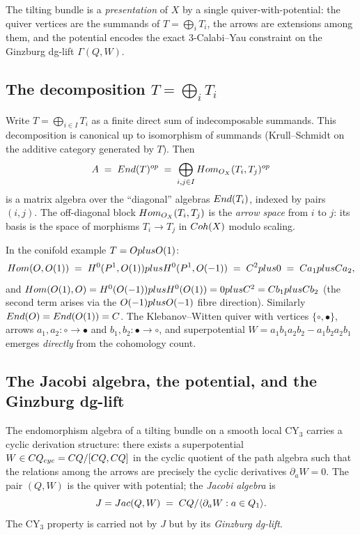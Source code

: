 The tilting bundle is a \emph{presentation} of $X$ by a single
quiver-with-potential: the quiver vertices are the summands of
$T = \bigoplus_i T_i$, the arrows are extensions among them, and the potential
encodes the exact $3$-Calabi--Yau constraint on the Ginzburg dg-lift
$\Gamma(Q, W)$.

\subsection*{The decomposition $T = \bigoplus_i T_i$}

Write $T = \bigoplus_{i \in I} T_i$ as a finite direct sum of indecomposable
summands. This decomposition is canonical up to isomorphism of summands
(Krull--Schmidt on the additive category generated by $T$). Then
\[
  A \;=\; End(T)^{op} \;=\; \bigoplus_{i, j \in I}
  Hom_{O_X}(T_i, T_j)^{op}
\]
is a matrix algebra over the ``diagonal'' algebras $End(T_i)$, indexed by
pairs $(i,j)$. The off-diagonal block $Hom_{O_X}(T_i, T_j)$ is the
\emph{arrow space} from $i$ to $j$: its basis is the space of morphisms
$T_i \to T_j$ in $Coh(X)$ modulo scaling.

In the conifold example $T = O plus O(1)$:
\[
  Hom(O, O(1)) \;=\; H^{0}(P^1, O(1)) plus H^{0}(P^1, O(-1))
  \;=\; C^{2} plus 0 \;=\; C a_1 plus C a_2,
\]
and $Hom(O(1), O) = H^0(O(-1)) plus H^0(O(1)) = 0 plus C^{2}
= C b_1 plus C b_2$ (the second term arises via the $O(-1) plus
O(-1)$ fibre direction). Similarly $End(O) = End(O(1)) = C$. The
Klebanov--Witten quiver with vertices $\{\circ, \bullet\}$, arrows $a_1, a_2
\colon \circ \to \bullet$ and $b_1, b_2 \colon \bullet \to \circ$, and
superpotential $W = a_1 b_1 a_2 b_2 - a_1 b_2 a_2 b_1$ emerges \emph{directly}
from the cohomology count.

\subsection*{The Jacobi algebra, the potential, and the Ginzburg dg-lift}

The endomorphism algebra of a tilting bundle on a smooth local CY$_3$ carries
a cyclic derivation structure: there exists a superpotential
$W \in C Q_{cyc} = C Q / [C Q, C Q]$ in the cyclic quotient of
the path algebra such that the relations among the arrows are precisely the
cyclic derivatives $\partial_a W = 0$. The pair $(Q, W)$ is the quiver with
potential; the \emph{Jacobi algebra} is
\[
  J = Jac(Q, W) \;=\; C Q / \langle \partial_a W : a \in Q_1 \rangle.
\]
The CY$_3$ property is carried not by $J$ but by its \emph{Ginzburg dg-lift}.

